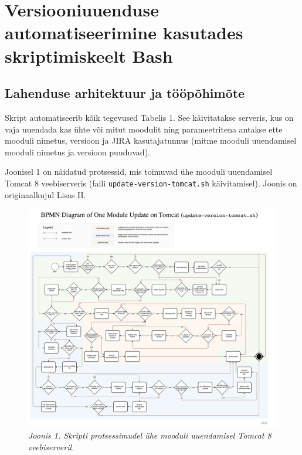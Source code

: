 \documentclass[12pt]{article}
\newcommand{\code}[1]{\texttt{#1}}
\begin{document}
  \section{Versiooniuuenduse automatiseerimine kasutades skriptimiskeelt Bash}
  
  \subsection{Lahenduse arhitektuur ja tööpõhimõte}
  
  Skript automatiseerib kõik tegevused Tabelis 1. See käivitatakse serveris, kus on vaja uuendada kas ühte või mitut moodulit ning parameetritena antakse ette mooduli nimetus, versioon ja JIRA kasutajatunnus (mitme mooduli uuendamisel mooduli nimetus ja versioon puuduvad).
  
  Joonisel 1 on näidatud protsessid, mis toimuvad ühe mooduli uuendamisel Tomcat 8 veebiserveris (faili \code{update-version-tomcat.sh} käivitamisel). Joonis on originaalkujul Lisas II.
   
   \begin{figure}[H]
     \begin{center}
       \includegraphics[width=.8\textwidth]{diagrams/BPMN-diagram-one-module-tomcat.png}
       \caption*{\textit{Joonis 1. Skripti protsessimudel ühe mooduli uuendamisel Tomcat 8 veebiserveril.}}
     \end{center}
   \end{figure}
   
   \newpage
   
\end{document}
